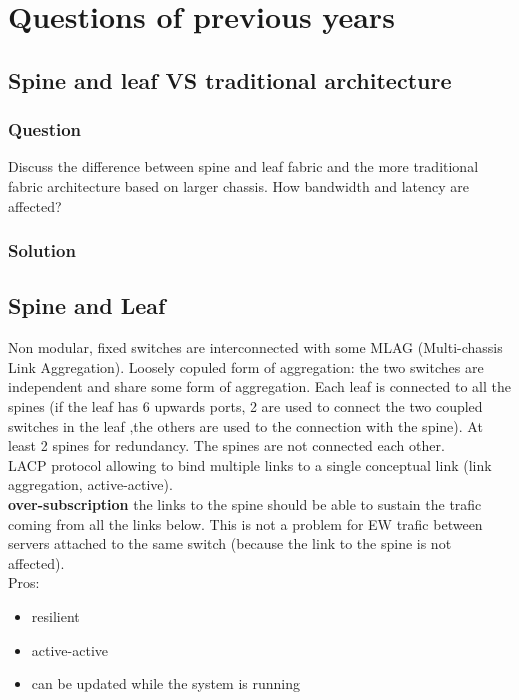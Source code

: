 \chapter{Questions of previous years}
\section{Spine and leaf VS traditional
architecture}\label{spine-and-leaf-vs-traditional-architecture}

\hypertarget{question}{%
\subsection{Question}\label{question}}

Discuss the difference between spine and leaf fabric and the more
traditional fabric architecture based on larger chassis. How bandwidth
and latency are affected?

\hypertarget{solution}{%
\subsection{Solution}\label{solution}}

\hypertarget{spine-and-leaf}{%
\section{Spine and Leaf}\label{spine-and-leaf}}

Non modular, fixed switches are interconnected with some MLAG
(Multi-chassis Link Aggregation). Loosely copuled form of aggregation:
the two switches are independent and share some form of aggregation.
Each leaf is connected to all the spines (if the leaf has 6 upwards
ports, 2 are used to connect the two coupled switches in the leaf ,the
others are used to the connection with the spine). At least 2 spines for
redundancy. The spines are not connected each other.\\
LACP protocol allowing to bind multiple links to a single conceptual
link (link aggregation, active-active).\\
\textbf{over-subscription} the links to the spine should be able to
sustain the trafic coming from all the links below. This is not a
problem for EW trafic between servers attached to the same switch
(because the link to the spine is not affected).\\
Pros:

\begin{itemize}
\item
  resilient
\item
  active-active
\item
  can be updated while the system is running
\end{itemize}

